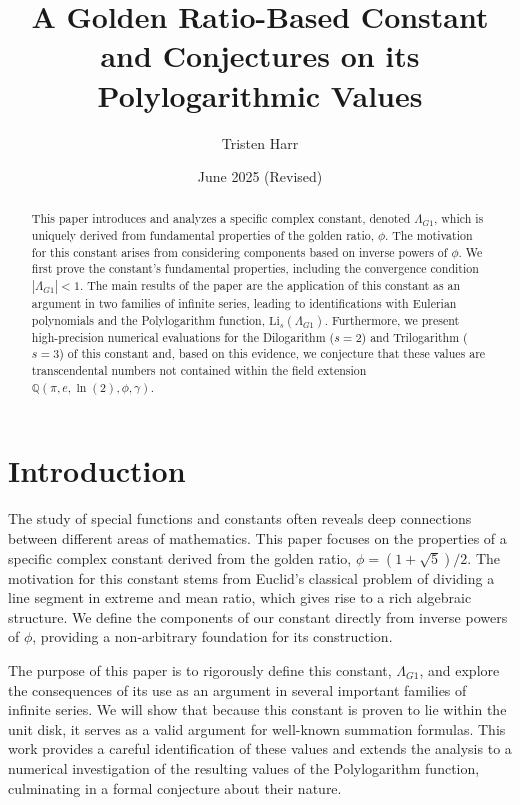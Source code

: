 \documentclass{amsart}
\theoremstyle{plain}
\theoremstyle{definition}
\theoremstyle{remark}
\newcommand{\LambdaG}{\Lambda_{G1}}
\begin{document}
\title[A Golden Ratio Constant and its Polylogarithmic Values]{A Golden Ratio-Based Constant and Conjectures on its Polylogarithmic Values}
\author{Tristen Harr}
\date{June 2025 (Revised)}

\begin{abstract}
This paper introduces and analyzes a specific complex constant, denoted $\LambdaG$, which is uniquely derived from fundamental properties of the golden ratio, $\phi$. The motivation for this constant arises from considering components based on inverse powers of $\phi$. We first prove the constant's fundamental properties, including the convergence condition $|\LambdaG| < 1$. The main results of the paper are the application of this constant as an argument in two families of infinite series, leading to identifications with Eulerian polynomials and the Polylogarithm function, $\mathrm{Li}_s(\LambdaG)$. Furthermore, we present high-precision numerical evaluations for the Dilogarithm ($s=2$) and Trilogarithm ($s=3$) of this constant and, based on this evidence, we conjecture that these values are transcendental numbers not contained within the field extension $\mathbb{Q}(\pi, e, \ln(2), \phi, \gamma)$.
\end{abstract}

\maketitle

\section{Introduction}
The study of special functions and constants often reveals deep connections between different areas of mathematics. This paper focuses on the properties of a specific complex constant derived from the golden ratio, $\phi = (1+\sqrt{5})/2$. The motivation for this constant stems from Euclid's classical problem of dividing a line segment in extreme and mean ratio, which gives rise to a rich algebraic structure. We define the components of our constant directly from inverse powers of $\phi$, providing a non-arbitrary foundation for its construction.

The purpose of this paper is to rigorously define this constant, $\LambdaG$, and explore the consequences of its use as an argument in several important families of infinite series. We will show that because this constant is proven to lie within the unit disk, it serves as a valid argument for well-known summation formulas. This work provides a careful identification of these values and extends the analysis to a numerical investigation of the resulting values of the Polylogarithm function, culminating in a formal conjecture about their nature.
\end{document}
